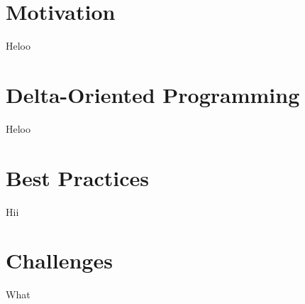 \section{Motivation}
\begin{frame}{Heloo}
	\begin{fancycolumns}[widths={30},animation=none]

	\end{fancycolumns}
\end{frame}


\section{Delta-Oriented Programming}

\begin{frame}{Heloo}
	\begin{fancycolumns}[widths={30},animation=none]
		
	\end{fancycolumns}
\end{frame}


\section{Best Practices}

\begin{frame}{Hii}
	\begin{fancycolumns}[widths={30},animation=none]
		
	\end{fancycolumns}
\end{frame}



\section{Challenges}

\begin{frame}{What}
	\begin{fancycolumns}[widths={30},animation=none]
		
	\end{fancycolumns}
\end{frame}


